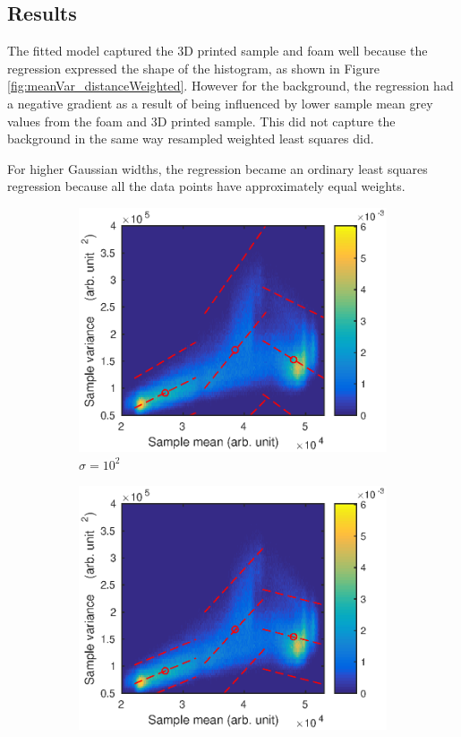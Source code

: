 \documentclass[12pt]{report}
\begin{document}
\subsection{Results}
The fitted model captured the 3D printed sample and foam well because the regression expressed the shape of the histogram, as shown in Figure \ref{fig:meanVar_distanceWeighted}. However for the background, the regression had a negative gradient as a result of being influenced by lower sample mean grey values from the foam and 3D printed sample. This did not capture the background in the same way resampled weighted least squares did.

For higher Gaussian widths, the regression became an ordinary least squares regression because all the data points have approximately equal weights.

\begin{figure}
	\centering
	\begin{subfigure}{0.45\textwidth}
		\includegraphics[width=\textwidth]{figures/meanVar/gaussian_1.eps}
		\caption{$\sigma=10^2$}
	\end{subfigure}
	\begin{subfigure}{0.45\textwidth}
		\includegraphics[width=\textwidth]{figures/meanVar/gaussian_2.eps}

\end{subfigure}
\end{figure}
\end{document}
